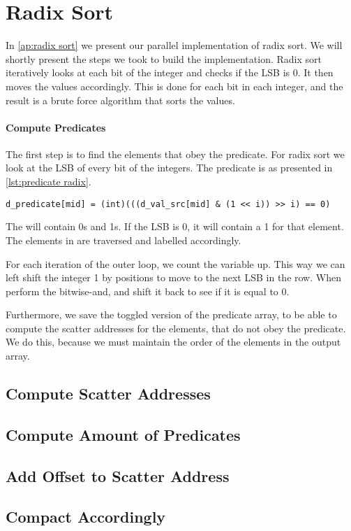 \section{Radix Sort}
\label{sec:radix sort}

In \cref{ap:radix sort} we present our parallel implementation of radix sort.
We will shortly present the steps we took to build the implementation.
Radix sort iteratively looks at each bit of the integer and checks if the LSB is 0.
It then moves the values accordingly.
This is done for each bit in each integer, and the result is a brute force algorithm that sorts the values.


\paragraph{Compute Predicates}
The first step is to find the elements that obey the predicate.
For radix sort we look at the LSB of every bit of the integers.
The predicate is as presented in \cref{lst:predicate radix}.

\begin{lstlisting}[caption={predicate to calculate}, label={lst:predicate radix}]
d_predicate[mid] = (int)(((d_val_src[mid] & (1 << i)) >> i) == 0)
\end{lstlisting}

The  will contain 0s and 1s.
If the LSB is 0, it will contain a 1 for that element.
The elements in  are traversed and labelled accordingly.

For each iteration of the outer loop, we count the  variable up.
This way we can left shift the integer 1 by  positions to move to the next LSB in the row.
When perform the bitwise-and, and shift it back to see if it is equal to 0.

Furthermore, we save the toggled version of the predicate array, to be able to compute the scatter addresses for the elements, that do not obey the predicate.
We do this, because we must maintain the order of the elements in the output array.

\subsection*{Compute Scatter Addresses}

\subsection*{Compute Amount of Predicates}

\subsection*{Add Offset to Scatter Address}

\subsection*{Compact Accordingly}


